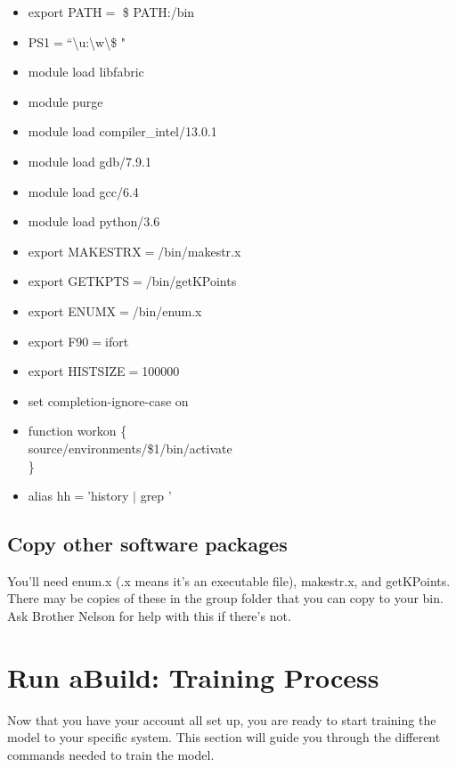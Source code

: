 \documentclass{article}
\begin{document}
\vspace{5mm}
\begin{itemize}
  \item{export PATH$=$ \$ PATH:\texttildelow \slash bin}  
  \item{PS1$=$``\textbackslash u:\textbackslash w\textbackslash \$ "}
  \item{module load libfabric}
  \item{module purge}
  \item{module load compiler\_intel\slash 13.0.1}
  \item{module load gdb\slash 7.9.1}
  \item{module load gcc\slash 6.4}
  \item{module load python\slash 3.6}
  \item{export MAKESTRX$=$\texttildelow\slash bin\slash makestr.x}
  \item{export GETKPTS$=$\texttildelow\slash bin\slash getKPoints}
  \item{export ENUMX$=$\texttildelow\slash bin\slash enum.x}
  \item{export F90$=$ifort}
  \item{export HISTSIZE$=$100000}
  \item{set completion-ignore-case on}
  \item{function workon \{\\
      source\texttildelow /environments/\$1/bin/activate\\
      \} }
  \item{alias hh$=$'history $|$ grep '}
\end{itemize}

\subsection{Copy other software packages}
You'll need enum.x (.x means it's an executable file), makestr.x, and
getKPoints. There may be copies of these in the group folder that you
can copy to your bin. Ask Brother Nelson for help with this if there's
not. 

\section{Run aBuild: Training Process}                      
Now that you have your account all set up, you are ready to start
training the model to your specific system. This section will guide
you through the different commands needed to train the model. 
\end{document}

